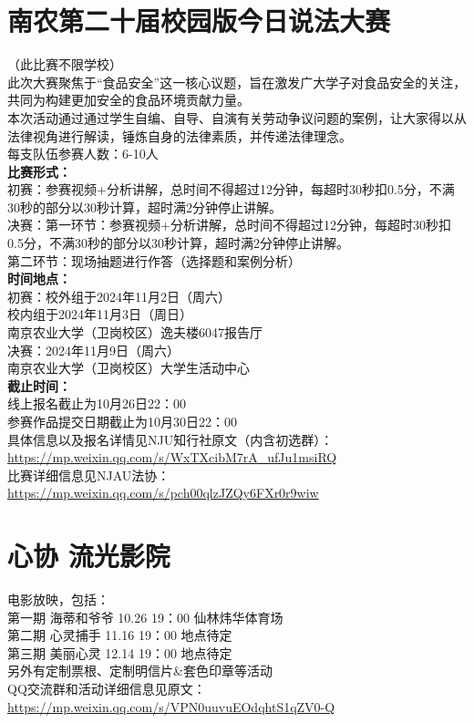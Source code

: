 \documentclass[letterpaper, 12pt]{article}
\begin{document}
\begin{multicols}{2}
\section{南农第二十届校园版今日说法大赛}
（此比赛不限学校）\\
此次大赛聚焦于“食品安全”这一核心议题，旨在激发广大学子对食品安全的关注，共同为构建更加安全的食品环境贡献力量。\\
本次活动通过通过学生自编、自导、自演有关劳动争议问题的案例，让大家得以从法律视角进行解读，锤炼自身的法律素质，并传递法律理念。\\
每支队伍参赛人数：6-10人\\
\textbf{比赛形式：}\\
初赛：参赛视频+分析讲解，总时间不得超过12分钟，每超时30秒扣0.5分，不满30秒的部分以30秒计算，超时满2分钟停止讲解。\\
决赛：第一环节：参赛视频+分析讲解，总时间不得超过12分钟，每超时30秒扣0.5分，不满30秒的部分以30秒计算，超时满2分钟停止讲解。\\
第二环节：现场抽题进行作答（选择题和案例分析）\\
\textbf{时间地点：}\\
初赛：校外组于2024年11月2日（周六）\\
校内组于2024年11月3日（周日）\\
南京农业大学（卫岗校区）逸夫楼6047报告厅\\
决赛：2024年11月9日（周六）\\南京农业大学（卫岗校区）大学生活动中心\\
\textbf{截止时间：}\\
线上报名截止为10月26日22：00\\
参赛作品提交日期截止为10月30日22：00\\
具体信息以及报名详情见NJU知行社原文（内含初选群）：\url{https://mp.weixin.qq.com/s/WxTXcibM7rA_ufJu1msiRQ}\\
比赛详细信息见NJAU法协：\url{https://mp.weixin.qq.com/s/pch00qlzJZQy6FXr0r9wiw}

\section{心协 流光影院}
电影放映，包括：\\
第一期 海蒂和爷爷 10.26 19：00 仙林炜华体育场\\
第二期 心灵捕手 11.16 19：00 地点待定\\
第三期 美丽心灵 12.14 19：00 地点待定\\
另外有定制票根、定制明信片&套色印章等活动\\
QQ交流群和活动详细信息见原文：\url{https://mp.weixin.qq.com/s/VPN0uuvuEOdqhtS1qZV0-Q}


\end{multicols}
\end{document}
